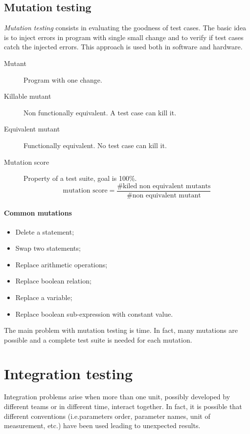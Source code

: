 \subsection{Mutation testing}
\emph{Mutation testing} consists in evaluating the goodness of test cases. The basic idea is to inject errors in program with single small change and to verify if test cases catch the injected errors. This approach is used both in software and hardware.

\begin{description}
\item [Mutant] Program with one change.
\item [Killable mutant] Non functionally equivalent. A test case can kill it.
\item [Equivalent mutant] Functionally equivalent. No test case can kill it.
\item [Mutation score] Property of a test suite, goal is 100\%.
\[
\text{mutation score} = \dfrac{\text{\# kiled non equivalent mutants}}{\text{\# non equivalent mutant}}
\]
\end{description}

\paragraph{Common mutations}
\begin{itemize}
\item Delete a statement;
\item Swap two statements;
\item Replace arithmetic operations;
\item Replace boolean relation;
\item Replace a variable;
\item Replace boolean sub-expression with constant value.
\end{itemize}

The main problem with mutation testing is time. In fact, many mutations are possible and a complete test suite is needed for each mutation.

\section{Integration testing}
Integration problems arise when more than one unit, possibly developed by different teams or in different time, interact together. In fact, it is possible that different conventions (i.e.\@ parameters order, parameter names, unit of measurement, etc.) have been used leading to unexpected results.

